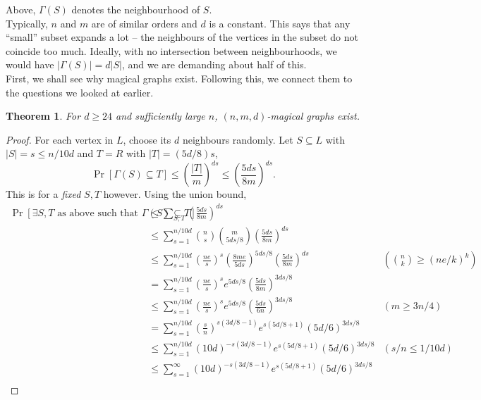 \documentclass{article}
\newcounter{lecnum}
\newtheorem{theorem}{Theorem}[lecnum]
\begin{document}
	Above, $\Gamma(S)$ denotes the neighbourhood of $S$.\\
	Typically, $n$ and $m$ are of similar orders and $d$ is a constant.
	This says that any ``small'' subset expands a lot -- the neighbours of the vertices in the subset do not coincide too much. Ideally, with no intersection between neighbourhoods, we would have $|\Gamma(S)| = d|S|$, and we are demanding about half of this.\\
	First, we shall see why magical graphs exist. Following this, we connect them to the questions we looked at earlier.\\

	\begin{theorem}
		For $d\ge 24$ and sufficiently large $n$, $(n,m,d)$-magical graphs exist.
	\end{theorem}
	\begin{proof}
		For each vertex in $L$, choose its $d$ neighbours randomly. Let $S \subseteq L$ with $|S| = s \le n/10d$ and $T = R$ with $|T| = (5d/8)s$,
		\[ \Pr\left[ \Gamma(S) \subseteq T \right] \le \left( \frac{|T|}{m} \right)^{ds} \le \left( \frac{5ds}{8m} \right)^{ds}. \]
		This is for a \emph{fixed} $S,T$ however. Using the union bound,
		\begin{align*}
			\Pr\left[ \text{$\exists S,T$ as above such that }\Gamma(S) \subseteq T \right] &\le \sum_{S,T} \left( \frac{5ds}{8m} \right)^{ds} \\
				&\le  \sum_{s=1}^{n/10d} \binom{n}{s} \binom{m}{5ds/8} \left(\frac{5ds}{8m}\right)^{ds} \\
				&\le \sum_{s=1}^{n/10d} \left(\frac{ne}{s}\right)^s \left(\frac{8me}{5ds}\right)^{5ds/8} \left( \frac{5ds}{8m} \right)^{ds} & \left(\binom{n}{k} \ge (ne/k)^k\right) \\ %
				&= \sum_{s=1}^{n/10d} \left( \frac{ne}{s} \right)^s e^{5ds/8} \left(\frac{5ds}{8m}\right)^{3ds/8} \\
				&\le \sum_{s=1}^{n/10d} \left( \frac{ne}{s} \right)^s e^{5ds/8} \left(\frac{5ds}{6n}\right)^{3ds/8} & (m\ge 3n/4) \\
				&= \sum_{s=1}^{n/10d} \left(\frac{s}{n}\right)^{s(3d/8 - 1)} e^{s(5d/8+1)} \left(5d/6\right)^{3ds/8} \\
				&\le \sum_{s=1}^{n/10d}  (10d)^{-s(3d/8-1)} e^{s(5d/8+1)} \left(5d/6\right)^{3ds/8} & (s/n \le 1/10d) \\
				&\le \sum_{s=1}^{\infty}  (10d)^{-s(3d/8-1)} e^{s(5d/8+1)} \left(5d/6\right)^{3ds/8} \\

\end{align*}
\end{proof}
\end{document}
